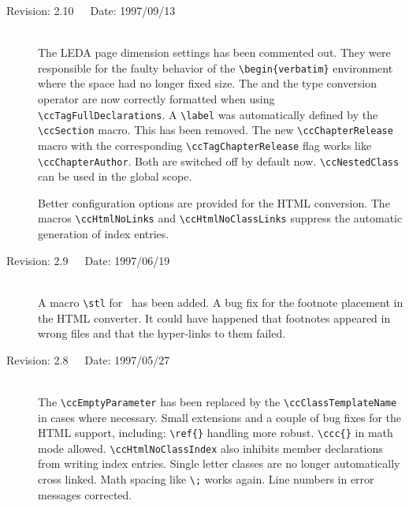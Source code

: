 \documentclass[11pt]{article}
\begin{document}
\begin{description}
    \item[Revision: 2.10~~~Date: 1997/09/13]~\\[3mm]
    The LEDA page dimension settings has been commented out. They were
    responsible for the faulty behavior of the \verb+\begin{verbatim}+
    environment where the space had no longer fixed size. The
     and the type conversion operator are now correctly
    formatted when using \verb+\ccTagFullDeclarations+.  A \verb+\label+
    was automatically defined by the \verb+\ccSection+ macro. This has
    been removed. The new \verb+\ccChapterRelease+ macro with the
    corresponding \verb+\ccTagChapterRelease+ flag works like
    \verb+\ccChapterAuthor+. Both are switched off by default now.
    \verb+\ccNestedClass+ can be used in the global scope.

    Better configuration options are provided for the HTML conversion.
    The macros \verb+\ccHtmlNoLinks+ and \verb+\ccHtmlNoClassLinks+
    suppress the automatic generation of index entries.


    \item[Revision: 2.9~~~Date: 1997/06/19]~\\[3mm]
    A macro \verb+\stl+ for \stl\ has been added. A bug fix for the
    footnote placement in the HTML converter. It could have happened that
    footnotes appeared in wrong files and that the hyper-links to them
    failed.

    \item[Revision: 2.8~~~Date: 1997/05/27]~\\[3mm]
    The \verb+\ccEmptyParameter+ has been replaced by the
    \verb+\ccClassTemplateName+ in cases where necessary. Small extensions
    and a couple of bug fixes for the HTML support, including:
    \verb+\ref{}+ handling more robust. \verb+\ccc{}+ in math mode
    allowed. \verb+\ccHtmlNoClassIndex+ also inhibits member declarations
    from writing index entries. Single letter classes are no longer
    automatically cross linked. Math spacing like \verb+\;+ works again. Line
    numbers in error messages corrected.


\end{description}
\end{document}

